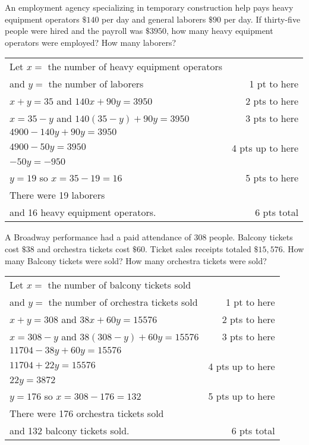 {
	An employment agency specializing in temporary construction help pays heavy equipment operators $\$140$ per day and general laborers $\$90$ per day. If thirty-five people were hired and the payroll was $\$3950$, how many heavy equipment operators were employed? How many laborers?
}
{
	\begin{tabular}{l r}
	Let $x =$ the number of heavy equipment operators\\ 
	and $y =$ the number of laborers & 1 pt to here\\
	$x + y = 35$ and   $140x + 90y = 3950$ &  2 pts to here\\
	$x = 35 - y$ and  $140(35 - y) +90y =3950$  & 3 pts to here\\
	$4900 - 140y + 90y = 3950$\\
	$4900-50y  = 3950$ &  4 pts up to here\\
	$-50y  = -950$\\
	$y = 19 $ so $x =35-19=16$ & 5 pts to here\\
	There were 19 laborers\\  and 16 heavy equipment operators.  & 6 pts total\\ 
	\end{tabular}
}

{
	A Broadway performance had a paid attendance of 308 people. Balcony tickets cost $\$38$ and orchestra tickets cost $\$60$. Ticket sales receipts totaled $\$15,576$. How many Balcony tickets were sold? How many orchestra tickets were sold?
}
{
	\begin{tabular}{l r}
	Let $x =$ the number of balcony tickets sold\\ 
	and $y =$ the number of orchestra tickets sold & 1 pt to here\\
	$x + y = 308$     and   $38x + 60y = 15576$ & 2 pts to here\\
	$x = 308 - y$ and    $38(308 - y) +60y =15576$ & 3 pts to here\\
	$11704 - 38y + 60y = 15576$\\
	$11704 + 22y  = 15576$ & 4 pts up to here\\
	$22y  = 3872$\\
	$y = 176$ so $x =308-176=132$ & 5 pts up to here \\
	There were 176 orchestra tickets sold \\and 132 balcony tickets sold.  & 6 pts total\\
	\end{tabular}
}

